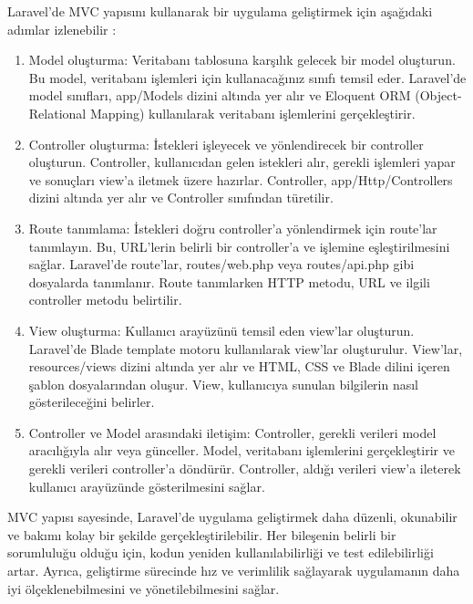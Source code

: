Laravel'de MVC yapısını kullanarak bir uygulama geliştirmek için aşağıdaki adımlar izlenebilir :

\begin{enumerate}
\item Model oluşturma:
Veritabanı tablosuna karşılık gelecek bir model oluşturun. Bu model, veritabanı işlemleri için kullanacağınız sınıfı temsil eder. Laravel'de model sınıfları, app/Models dizini altında yer alır ve Eloquent ORM (Object-Relational Mapping) kullanılarak veritabanı işlemlerini gerçekleştirir.

\item Controller oluşturma:
İstekleri işleyecek ve yönlendirecek bir controller oluşturun. Controller, kullanıcıdan gelen istekleri alır, gerekli işlemleri yapar ve sonuçları view'a iletmek üzere hazırlar. Controller, app/Http/Controllers dizini altında yer alır ve Controller sınıfından türetilir.

\item Route tanımlama:
İstekleri doğru controller'a yönlendirmek için route'lar tanımlayın. Bu, URL'lerin belirli bir controller'a ve işlemine eşleştirilmesini sağlar. Laravel'de route'lar, routes/web.php veya routes/api.php gibi dosyalarda tanımlanır. Route tanımlarken HTTP metodu, URL ve ilgili controller metodu belirtilir.

\item View oluşturma:
Kullanıcı arayüzünü temsil eden view'lar oluşturun. Laravel'de Blade template motoru kullanılarak view'lar oluşturulur. View'lar, resources/views dizini altında yer alır ve HTML, CSS ve Blade dilini içeren şablon dosyalarından oluşur. View, kullanıcıya sunulan bilgilerin nasıl gösterileceğini belirler.

\item Controller ve Model arasındaki iletişim:
Controller, gerekli verileri model aracılığıyla alır veya günceller. Model, veritabanı işlemlerini gerçekleştirir ve gerekli verileri controller'a döndürür. Controller, aldığı verileri view'a ileterek kullanıcı arayüzünde gösterilmesini sağlar.
\end{enumerate}

MVC yapısı sayesinde, Laravel'de uygulama geliştirmek daha düzenli, okunabilir ve bakımı kolay bir şekilde gerçekleştirilebilir. Her bileşenin belirli bir sorumluluğu olduğu için, kodun yeniden kullanılabilirliği ve test edilebilirliği artar. Ayrıca, geliştirme sürecinde hız ve verimlilik sağlayarak uygulamanın daha iyi ölçeklenebilmesini ve yönetilebilmesini sağlar.

